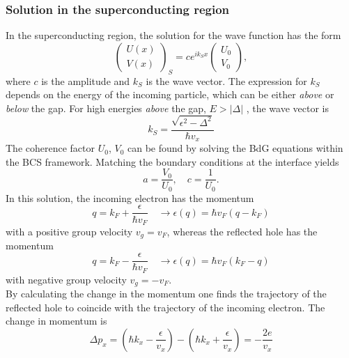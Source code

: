 \subsubsection*{Solution in the superconducting region}
In the superconducting region, the solution for the wave function has the form
\begin{equation}
\begin{pmatrix} U(x) \\ V(x) \end{pmatrix}_S = c e^{i k_S x } \begin{pmatrix} U_0 \\ V_0 \end{pmatrix},
\end{equation}
where $c$ is the amplitude and $k_S$ is the wave vector. The expression for $k_S$ depends on the energy of the incoming particle, which can be either \emph{above} or \emph{below} the gap.\newline \newline
For high energies \emph{above} the gap,  $E > |\Delta|$ , the wave vector is
\begin{equation}
k_S = \frac{\sqrt{\epsilon^2 - \Delta^2}}{\hbar v_x}
\end{equation}
The coherence factor $U_0$, $V_0$ can be found by solving the BdG equations within the BCS framework. Matching the boundary conditions at the interface yields
\begin{equation}
a = \frac{V_0}{U_0}, \quad c = \frac{1}{U_0}.
\end{equation}
In this solution, the incoming electron has the momentum 
\begin{equation}
q  = k_F + \frac{\epsilon}{\hbar v_F} \quad \rightarrow \epsilon(q) = \hbar v_F \left( q - k_F \right)
\end{equation}
with a positive group velocity $v_g = v_F$, whereas the reflected hole has the momentum
\begin{equation}
q  = k_F - \frac{\epsilon}{\hbar v_F} \quad \rightarrow \epsilon(q) = \hbar v_F \left( k_F - q \right)
\end{equation} 
with negative group velocity $v_g = - v_F$. \\
By calculating the change in the momentum one finds the trajectory of the reflected hole to coincide with the trajectory of the incoming electron. The change in momentum is
\begin{equation}
\Delta p_x = \left( \hbar k_x - \frac{\epsilon}{v_x} \right) -  \left( \hbar k_x + \frac{\epsilon}{v_x} \right) = - \frac{2 e }{v_x}
\end{equation}
